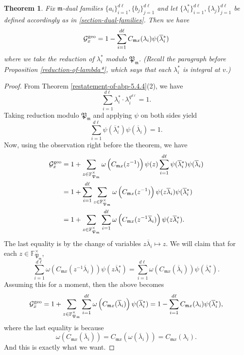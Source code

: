\documentclass[11pt]{amsart}
\theoremstyle{plain}
\newtheorem{thm}{Theorem}[subsection]
\theoremstyle{definition}
\theoremstyle{remark}
\numberwithin{equation}{section}
\newcommand{\FF}{\mathbb{F}}
\newcommand{\mfk}{\mathfrak{m}}
\newcommand{\Pfk}{\mathfrak{P}}
\newcommand{\Gcal}{\mathcal{G}}
\newcommand{\ovl}{\overline}
\newcommand{\bggs}{\Gcal^{\textnormal{geo}}}
\let\l\ell
\begin{document}
	\begin{thm}   \label{coleman-function-and-gauss-sum}
		Fix $\mfk$-dual families $\{a_i\}_{i=1}^{d\l}, \{b_j\}_{j=1}^{d\l}$ and let $\{\lambda_i^*\}_{i=1}^{d\l}, \{\lambda_j\}_{j=1}^{d\l}$ be defined accordingly as in \ref{section-dual-families}.
		Then we have
		$$
		\bggs_x
		= 1 - \sum_{i=1}^{d\l} C_{\mfk x}(\lambda_i) \psi(\ovl{\lambda}{}^*_i)
		$$
		where we take the reduction of $\lambda_i^*$ modulo $\Pfk_\mfk$.
		(Recall the paragraph before Proposition \ref{reduction-of-lambda*}, which says that each $\lambda_i^*$ is integral at $v$.)
	\end{thm}
	
	\begin{proof}
		From Theorem \ref{restatement-of-abp-5.4.4}(2), we have
		$$
		\sum_{i=1}^{d\l} \lambda_i^* \cdot \lambda_i^{q^{d\l}} = 1.
		$$
		Taking reduction modulo $\Pfk_\mfk$ and applying $\psi$ on both sides yield
		$$
		\sum_{i=1}^{d\l} \psi(\ovl{\lambda}{}^*_i) \psi(\ovl{\lambda}_i) = 1.
		$$
		Now, using the observation right before the theorem, we have
		\begin{align*}
			\bggs_x
			&= 1 + \sum_{z \in \FF_{\Pfk_\mfk}^\times} \omega\left(C_{\mfk x} (z^{-1})\right)\psi(z) \sum_{i=1}^{d\l} \psi(\ovl{\lambda}{}^*_i) \psi(\ovl{\lambda}_i)    \\
			&= 1 + \sum_{i=1}^{d\l} \sum_{z \in \FF_{\Pfk_\mfk}^\times} \omega\left(C_{\mfk x} (z^{-1})\right) \psi(z \ovl{\lambda}_i) \psi(\ovl{\lambda}{}^*_i)  \\
			&= 1 + \sum_{z \in \FF_{\Pfk_\mfk}^\times} \sum_{i=1}^{d\l} \omega\left(C_{\mfk x} (z^{-1}\ovl{\lambda}_i)\right) \psi(z\ovl{\lambda}{}^*_i).
		\end{align*}
		The last equality is by the change of variables $z \ovl{\lambda}_i \mapsto z$.
		We will claim that for each $z \in \FF_{\Pfk_\mfk}^\times$,
		\begin{equation}      \label{claim-in-coleman-function-and-gauss-sum}
			\sum_{i=1}^{d\l} \omega\left(C_{\mfk x} (z^{-1}\ovl{\lambda}_i)\right) \psi(z \ovl{\lambda}{}^*_i)
			=  \sum_{i=1}^{d\l} \omega\left(C_{\mfk x} (\ovl{\lambda}_i)\right) \psi(\ovl{\lambda}{}^*_i).
		\end{equation}
		Assuming this for a moment, then the above becomes
		$$
		\bggs_x
		= 1 + \sum_{z \in \FF_{\Pfk_\mfk}^\times} \sum_{i=1}^{d\l} \omega\left(C_{\mfk x} (\ovl{\lambda}_i)\right) \psi(\ovl{\lambda}{}^*_i)
		= 1 - \sum_{i=1}^{d\l} C_{\mfk x}(\lambda_i) \psi(\ovl{\lambda}{}^*_i),
		$$
		where the last equality is because
		$$
		\omega\left(C_{\mfk x} (\ovl{\lambda}_i)\right)
		= C_{\mfk x}\left(\omega(\ovl{\lambda}_i)\right)
		= C_{\mfk x}(\lambda_i).
		$$
		And this is exactly what we want.
		

\end{proof}
\end{document}
